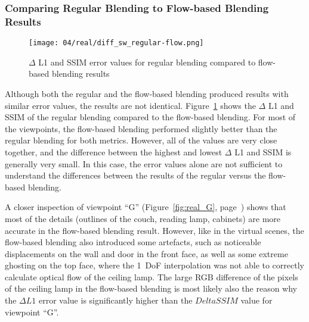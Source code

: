 \subsubsection{Comparing Regular Blending to Flow-based Blending Results}
\begin{figure}
		\centering
		\texttt{[image: 04/real/diff\_sw\_regular-flow.png]}
		\caption{$\Delta$ L1 and SSIM error values for regular blending compared to flow-based blending results}
		\label{fig:real_diff}
\end{figure}


Although both the regular and the flow-based blending produced results with similar error values, the results are not identical. 
%
Figure~\ref{fig:real_diff} shows the $\Delta$ L1 and SSIM of the regular blending compared to the flow-based blending.
For most of the viewpoints, the flow-based blending performed slightly better than the regular blending for both metrics. However, all of the values are very close together, and the difference between the highest and lowest $\Delta$ L1 and SSIM is generally very small. In this case, the error values alone are not sufficient to understand the differences between the results of the regular versus the flow-based blending.

A closer inspection of viewpoint ``G'' (Figure~\ref{fig:real_G}, page~\pageref{fig:real_G}) shows that most of the details (outlines of the couch, reading lamp, cabinets) are more accurate in the flow-based blending result. However, like in the virtual scenes, the flow-based blending also introduced some artefacts, such as noticeable displacements on the wall and door in the front face, as well as some extreme ghosting on the top face, where the 1~DoF interpolation was not able to correctly calculate optical flow of the ceiling lamp. The large RGB difference of the pixels of the ceiling lamp in the flow-based blending is most likely also the reason why the $\Delta L1$ error value is significantly higher than the $Delta SSIM$ value for viewpoint ``G''.

